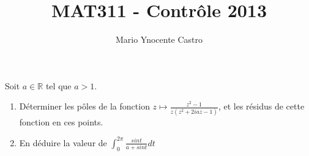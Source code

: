 \documentclass[10pt,a4paper,oneside]{article}
\newenvironment{exercice}[1][Exercice]{\begin{trivlist}
\item[\hskip \labelsep {\bfseries #1}]}{\end{trivlist}}
\begin{document}
\title{MAT311 - Contrôle 2013}
\author{Mario Ynocente Castro}

\maketitle

\begin{exercice}
Soit $a \in \mathbb{R}$ tel que $a > 1$.

\begin{enumerate}
\item
Déterminer les pôles de la fonction $z \mapsto \frac{z^2 - 1}{z(z^2 + 2iaz - 1)}$, et les résidus de cette fonction en ces points.

\item
En déduire la valeur de $\int_{0}^{2\pi} \frac{sint}{a + sint}dt$
\end{enumerate}
\end{exercice}
\end{document}
